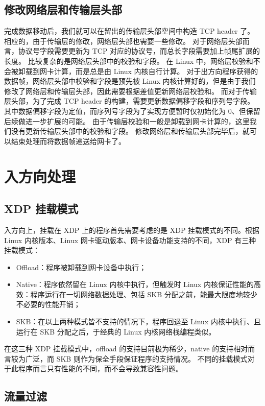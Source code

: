 \subsection{修改网络层和传输层头部}

完成数据移动后，我们就可以在留出的传输层头部空间中构造 TCP header 了。
相应的，由于传输层的修改，网络层头部也需要一些修改。
对于网络层头部而言，协议号字段需要更新为 TCP 对应的协议号，而总长字段需要加上帧尾扩展的长度。
比较复杂的是网络层头部中的校验和字段。
在 Linux 中，网络层校验和不会被卸载到网卡计算，而是总是由 Linux 内核自行计算。
对于出方向程序获得的数据帧，网络层头部中校验和字段是预先被 Linux 内核计算好的，但是由于我们修改了网络层和传输层头部，因此需要根据差值更新网络层校验和。
而对于传输层头部，为了完成 TCP header 的构建，需要更新数据偏移字段和序列号字段。
其中数据偏移字段为定值，而序列号字段为了实现方便暂时仅初始化为 0、但保留后续做进一步扩展的可能。
由于传输层校验和一般是卸载到网卡计算的，这里我们没有更新传输层头部中的校验和字段。
修改网络层和传输层头部完毕后，就可以结束处理而将数据帧递送给网卡了。

\section{入方向处理}

\subsection{XDP 挂载模式}

入方向上，挂载在 XDP 上的程序首先需要考虑的是 XDP 挂载模式的不同。根据 Linux 内核版本、Linux 网卡驱动版本、网卡设备功能支持的不同，XDP 有三种挂载模式：

\begin{itemize}
  \item Offload：程序被卸载到网卡设备中执行；
  \item Native：程序依然留在 Linux 内核中执行，但触发时 Linux 内核保证性能的高效：程序运行在一切网络数据处理、包括 SKB 分配之前，能最大限度地较少不必要的性能开销；
  \item SKB：在以上两种模式皆不支持的情况下，程序回退至 Linux 内核中执行、且运行在 SKB 分配之后，于经典的 Linux 内核网络栈编程类似。
\end{itemize}

在这三种 XDP 挂载模式中，offload 的支持目前极为稀少，native 的支持相对而言较为广泛，而 SKB 则作为保全手段保证程序的支持情况。
不同的挂载模式对于此程序而言只有性能的不同，而不会导致兼容性问题。

\subsection{流量过滤}

